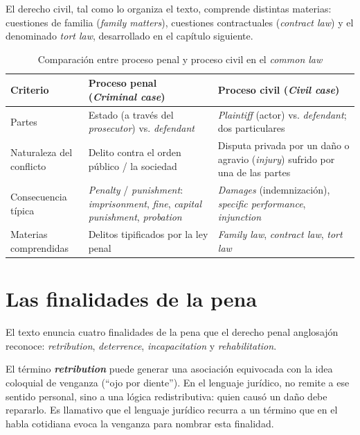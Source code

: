 \documentclass[12pt,oneside]{book}
\begin{document}
El derecho civil, tal como lo organiza el texto, comprende distintas materias: cuestiones de familia (\textit{family matters}), cuestiones contractuales (\textit{contract law}) y el denominado \textit{tort law}, desarrollado en el capítulo siguiente.

\bigskip

\begin{table}[H]
\centering
\caption{Comparación entre proceso penal y proceso civil en el \textit{common law}}
\begin{tabularx}{\textwidth}{
    >{\raggedright\arraybackslash}p{}
    >{\raggedright\arraybackslash}X
    >{\raggedright\arraybackslash}X
}
\toprule
\textbf{Criterio} & \textbf{Proceso penal (\textit{Criminal case})} & \textbf{Proceso civil (\textit{Civil case})} \\
\midrule
Partes & Estado (a través del \textit{prosecutor}) vs. \textit{defendant} & \textit{Plaintiff} (actor) vs. \textit{defendant}; dos particulares \\
\addlinespace
Naturaleza del conflicto & Delito contra el orden público / la sociedad & Disputa privada por un daño o agravio (\textit{injury}) sufrido por una de las partes \\
\addlinespace
Consecuencia típica & \textit{Penalty} / \textit{punishment}: \textit{imprisonment}, \textit{fine}, \textit{capital punishment}, \textit{probation} & \textit{Damages} (indemnización), \textit{specific performance}, \textit{injunction} \\
\addlinespace
Materias comprendidas & Delitos tipificados por la ley penal & \textit{Family law}, \textit{contract law}, \textit{tort law} \\
\bottomrule
\end{tabularx}
\end{table}

\section{Las finalidades de la pena}

El texto enuncia cuatro finalidades de la pena que el derecho penal anglosajón reconoce: \textit{retribution}, \textit{deterrence}, \textit{incapacitation} y \textit{rehabilitation}.

\begin{important}
El término \textbf{\textit{retribution}} puede generar una asociación equivocada con la idea coloquial de venganza (``ojo por diente''). En el lenguaje jurídico, no remite a ese sentido personal, sino a una lógica redistributiva: quien causó un daño debe repararlo. Es llamativo que el lenguaje jurídico recurra a un término que en el habla cotidiana evoca la venganza para nombrar esta finalidad.
\end{important}
\end{document}
